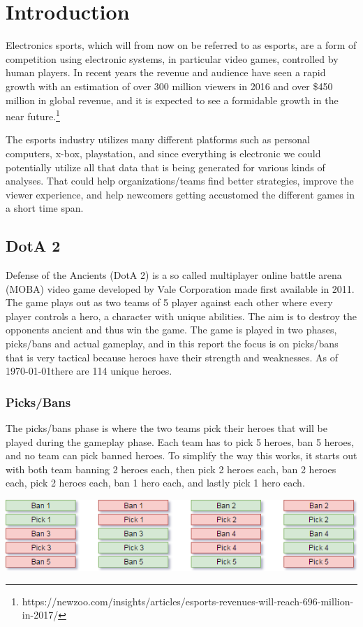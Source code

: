 \documentclass[report.tex]{subfiles}
\begin{document}
\section*{Introduction}

Electronics sports, which will from now on be referred to as esports, are a form of competition using electronic systems, in particular video games, controlled by human players. In recent years the revenue and audience have seen a rapid growth with an estimation of over 300 million viewers in 2016 and over \$450 million in global revenue, and it is expected to see a formidable growth in the near future.\footnote{https://newzoo.com/insights/articles/esports-revenues-will-reach-696-million-in-2017/}

The esports industry utilizes many different platforms such as personal computers, x-box, playstation, and since everything is electronic we could potentially utilize all that data that is being generated for various kinds of analyses. That could help organizations/teams find better strategies, improve the viewer experience, and help newcomers getting accustomed the different games in a short time span.

\subsection*{DotA 2}

Defense of the Ancients (DotA 2) is a so called multiplayer online battle arena (MOBA) video game developed by Vale Corporation made first available in 2011. The game plays out as two teams of 5 player against each other where every player controls a hero, a character with unique abilities. The aim is to destroy the opponents ancient and thus win the game. The game is played in two phases, picks/bans and actual gameplay, and in this report the focus is on picks/bans that is very tactical because heroes have their strength and weaknesses. As of \today there are 114 unique heroes.

\subsubsection*{Picks/Bans}

The picks/bans phase is where the two teams pick their heroes that will be played during the gameplay phase. Each team has to pick 5 heroes, ban 5 heroes, and no team can pick banned heroes. To simplify the way this works, it starts out with both team banning 2 heroes each, then pick 2 heroes each, ban 2 heroes each, pick 2 heroes each, ban 1 hero each, and lastly pick 1 hero each.

\includegraphics[width=\textwidth]{./images/dota2}
\end{document}
